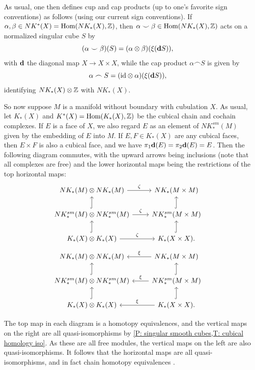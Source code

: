 As usual, one then defines cup and cap products (up to one's favorite sign conventions) as follows (using our current sign conventions).
If $\alpha, \beta \in NK^*(X) = \textup{Hom}(NK_*(X),\mathbb{Z})$, then $\alpha\smile \beta \in \textup{Hom}(NK_*(X),\mathbb{Z})$ acts on a normalized singular cube $S$ by
\begin{equation}\label{E: cubical cup}
	(\alpha \smile \beta)(S) = (\alpha \otimes \beta)(\xi(\mathbf{d} S)),
\end{equation}
with $\mathbf{d}$ the diagonal map $X \to X \times X$,
while the cap product $\alpha\frown S$ is given by
\begin{equation}\label{E: cubical cap}
	\alpha\frown S = (\mathrm{id} \otimes \alpha) (\xi(\mathbf{d} S)),
\end{equation}
identifying $NK_*(X) \otimes \mathbb{Z}$ with $NK_*(X)$.

So now suppose $M$ is a manifold without boundary with cubulation $X$.
As usual, let $K_*(X)$ and $K^*(X) = \textup{Hom}(K_*(X),\mathbb{Z})$ be the cubical chain and cochain complexes.
If $E$ is a face of $X$, we also regard $E$ as an element of $NK^{sm}_*(M)$ given by the embedding of $E$ into $M$.
If $E, F \in K_*(X)$ are any cubical faces, then $E \times F$ is also a cubical face, and  we have $\pi_1\mathbf{d}(E) = \pi_2\mathbf{d}(E) = E$.
Then the following diagram commutes, with the upward arrows being inclusions (note that all complexes are free) and the lower horizontal maps being the restrictions of the top horizontal maps:
\[
\begin{tikzcd}
	NK_*(M) \otimes NK_*(M) \arrow{r}{\zeta} & NK_*(M \times M) \\
	NK^{sm}_*(M) \otimes NK^{sm}_*(M) \arrow{r}{\zeta} \arrow[u, hook] & NK^{sm}_*(M \times M) \arrow[u, hook] \\
	K_*(X) \otimes K_*(X) \arrow{r}{\zeta} \arrow[u, hook] & K_*(X \times X). \arrow[u, hook]
\end{tikzcd}
\]
\begin{equation}\label{E: cube products}
\begin{tikzcd}
	NK_*(M) \otimes NK_*(M) & \arrow[l, "\xi"'] NK_*(M \times M) \\
	NK^{sm}_*(M) \otimes NK^{sm}_*(M) \arrow[u, hook] & \arrow[l, "\xi"'] NK^{sm}_*(M \times M) \arrow[u, hook] \\
	K_*(X) \otimes K_*(X) \arrow[u, hook] & \arrow[l, "\xi"'] K_*(X \times X). \arrow[u, hook]
\end{tikzcd}
\end{equation}

The top map in each diagram is a homotopy equivalences, and the vertical maps on the right are all quasi-isomorphisms by \cref{P: singular smooth cubes,T: cubical homology iso}.
As these are all free modules, the vertical maps on the left are also quasi-isomorphisms.
It follows that the horizontal maps are all quasi-isomorphisms, and in fact chain homotopy equivalences \cite[Theorem 46.2]{Mun84}.

